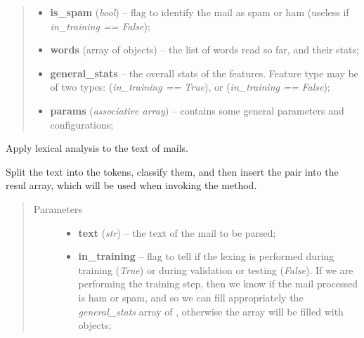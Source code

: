 \documentclass[letterpaper,10pt,english]{sphinxmanual}
\begin{document}
\begin{fulllineitems}
\begin{fulllineitems}
\begin{quote}
\begin{description}
\begin{itemize}
\item {} 
\textbf{is\_spam} (\emph{bool}) -- flag to identify the mail as spam or ham (useless if             \emph{in\_training == False});

\item {} 
\textbf{words} (array of {\hyperref[index:gen_stat.Word]{}} objects) -- the list of words read so far, and their stats;

\item {} 
\textbf{general\_stats} -- the overall stats of the features. Feature type may be            of two types:                {\hyperref[index:gen_stat.Stat]{}} (\emph{in\_training == True}), or                {\hyperref[index:test_stat.Test_stat]{}} (\emph{in\_training == False});

\item {} 
\textbf{params} (\emph{associative array}) -- contains some general parameters and configurations;

\end{itemize}

\end{description}\end{quote}

\end{fulllineitems}


\begin{fulllineitems}
\label{index:lexer.Lexer.lexer_words}
Apply lexical analysis to the text of mails.

Split the text into the tokens, classify them, and then insert the pair
into the resul array, which will be used when invoking the
{\hyperref[index:lexer.Lexer._process_tokens]{}} method.
\begin{quote}\begin{description}
\item[{Parameters}] \leavevmode\begin{itemize}
\item {} 
\textbf{text} (\emph{str}) -- the text of the mail to be parsed;

\item {} 
\textbf{in\_training} -- flag to tell if the lexing is performed during training            (\emph{True}) or during validation or testing (\emph{False}). If we are performing            the training step, then we know if the mail processed is ham or spam, and
so we can fill appropriately the \emph{general\_stats} array of
{\hyperref[index:gen_stat.Stat]{}}, otherwise the array will be filled with
{\hyperref[index:test_stat.Test_stat]{}} objects;


\end{itemize}
\end{description}
\end{quote}
\end{fulllineitems}
\end{fulllineitems}
\end{document}
